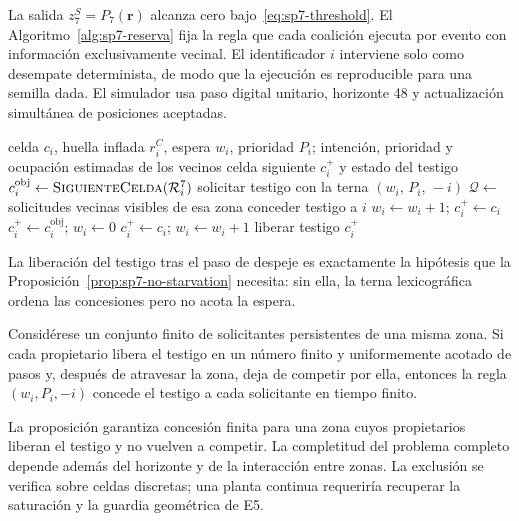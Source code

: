 La salida $z_7^S=P_7(\boldsymbol r)$ alcanza cero bajo~\eqref{eq:sp7-threshold}. El
Algoritmo~\ref{alg:sp7-reserva} fija la regla que cada coalición ejecuta por
evento con información exclusivamente vecinal. El identificador $i$ interviene
solo como desempate determinista, de modo que la ejecución es reproducible para
una semilla dada. El simulador usa paso digital unitario, horizonte 48 y
actualización simultánea de posiciones aceptadas.

\begin{algorithm}[!htbp]
\caption{Reserva vecinal y avance discreto de una coalición (E7)}
\label{alg:sp7-reserva}
\begin{algorithmic}[1]
\Require celda $c_i$, huella inflada $r_i^C$, espera $w_i$, prioridad $P_i$;
         intención, prioridad y ocupación estimadas de los vecinos
\Ensure celda siguiente $c_i^+$ y estado del testigo
\State $c_i^{\mathrm{obj}} \gets \Call{SiguienteCelda}{\mathcal R_i^7}$
  \State solicitar testigo con la terna $(w_i,\,P_i,\,-i)$
  \State $\mathcal Q \gets$ solicitudes vecinas visibles de esa zona
    \State conceder testigo a $i$
  \Else
    \State $w_i \gets w_i + 1$; \Return $c_i^+ \gets c_i$
  \EndIf
\EndIf
{}
  \State $c_i^+ \gets c_i^{\mathrm{obj}}$; $w_i \gets 0$
\Else
  \State $c_i^+ \gets c_i$; $w_i \gets w_i + 1$
\EndIf
{}
  \State liberar testigo
\EndIf
\Return $c_i^+$
\end{algorithmic}
\end{algorithm}

La liberación del testigo tras el paso de despeje es exactamente la hipótesis que
la Proposición~\ref{prop:sp7-no-starvation} necesita: sin ella, la terna
lexicográfica ordena las concesiones pero no acota la espera.

\begin{proposicion}
\label{prop:sp7-no-starvation}
Considérese un conjunto finito de solicitantes persistentes de una misma zona.
Si cada propietario libera el testigo en un número finito y uniformemente acotado
de pasos y, después de atravesar la zona, deja de competir por ella, entonces
la regla $(w_i,P_i,-i)$ concede el testigo a cada solicitante en tiempo finito.
\end{proposicion}
La proposición garantiza concesión finita para una zona cuyos propietarios liberan el testigo y no vuelven a competir. La completitud del problema completo depende además del horizonte y de la interacción entre zonas. La exclusión se verifica sobre celdas discretas; una planta continua requeriría recuperar la saturación y la guardia geométrica de E5.


